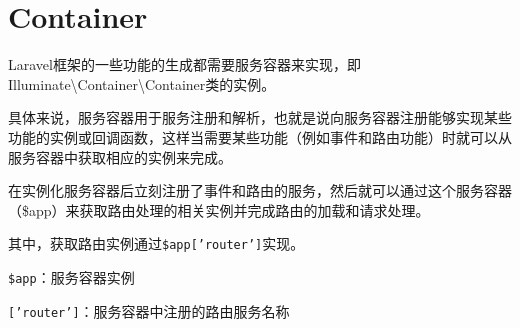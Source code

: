 \section{Container}

Laravel框架的一些功能的生成都需要服务容器来实现，即Illuminate\textbackslash Container\textbackslash Container类的实例。

具体来说，服务容器用于服务注册和解析，也就是说向服务容器注册能够实现某些功能的实例或回调函数，这样当需要某些功能（例如事件和路由功能）时就可以从服务容器中获取相应的实例来完成。

在实例化服务容器后立刻注册了事件和路由的服务，然后就可以通过这个服务容器（\$app）来获取路由处理的相关实例并完成路由的加载和请求处理。

其中，获取路由实例通过\texttt{\$app['router']}实现。

\begin{compactitem}
\item \texttt{\$app}：服务容器实例
\item \texttt{['router']}：服务容器中注册的路由服务名称
\end{compactitem}






